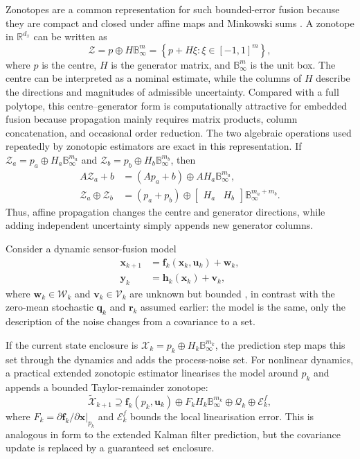 \documentclass[graybox,envcountchap]{style/SNmono}
\begin{document}
Zonotopes are a common representation for such bounded-error fusion because they are compact and closed under affine maps and Minkowski sums \cite{girard2005_zonotopes}. A zonotope in $\mathbb{R}^{d_x}$ can be written as
\begin{equation}
\mathcal{Z}=p\oplus H\mathbb{B}_{\infty}^{m}
=\left\{p+H\xi:\xi\in[-1,1]^m\right\},
\end{equation}
where $p$ is the centre, $H$ is the generator matrix, and $\mathbb{B}_{\infty}^{m}$ is the unit box. The centre can be interpreted as a nominal estimate, while the columns of $H$ describe the directions and magnitudes of admissible uncertainty. Compared with a full polytope, this centre--generator form is computationally attractive for embedded fusion because propagation mainly requires matrix products, column concatenation, and occasional order reduction.
The two algebraic operations used repeatedly by zonotopic estimators are exact in this representation. If $\mathcal{Z}_a=p_a\oplus H_a\mathbb{B}_{\infty}^{m_a}$ and $\mathcal{Z}_b=p_b\oplus H_b\mathbb{B}_{\infty}^{m_b}$, then
\begin{align}
A\mathcal{Z}_a+b
&=(Ap_a+b)\oplus AH_a\mathbb{B}_{\infty}^{m_a},\\
\mathcal{Z}_a\oplus\mathcal{Z}_b
&=(p_a+p_b)\oplus
\begin{bmatrix}H_a&H_b\end{bmatrix}
\mathbb{B}_{\infty}^{m_a+m_b}.
\end{align}
Thus, affine propagation changes the centre and generator directions, while adding independent uncertainty simply appends new generator columns.

Consider a dynamic sensor-fusion model
\begin{align}
\mathbf{x}_{k+1}&=\mathbf{f}_k(\mathbf{x}_k,\mathbf{u}_k)+\mathbf{w}_k,\\
\mathbf{y}_k&=\mathbf{h}_k(\mathbf{x}_k)+\mathbf{v}_k,
\end{align}
where $\mathbf{w}_k\in\mathcal{W}_k$ and $\mathbf{v}_k\in\mathcal{V}_k$ are unknown but bounded
, in contrast with the zero-mean stochastic $\mathbf{q}_k$ and $\mathbf{r}_k$ assumed earlier: the model is the same, only the description of the noise changes from a covariance to a set. 

If the current state enclosure is $\mathcal{X}_k=p_k\oplus H_k\mathbb{B}_{\infty}^{m_k}$, the prediction step maps this set through the dynamics and adds the process-noise set. For nonlinear dynamics, a practical extended zonotopic estimator linearises the model around $p_k$ and appends a bounded Taylor-remainder zonotope:
\begin{equation}
\widetilde{\mathcal{X}}_{k+1}
\supseteq
\mathbf{f}_k(p_k,\mathbf{u}_k)
\oplus F_k H_k\mathbb{B}_{\infty}^{m_k}
\oplus \mathcal{Q}_k
\oplus \mathcal{E}^{f}_k,
\end{equation}
where $F_k=\partial \mathbf{f}_k/\partial \mathbf{x}|_{p_k}$ and $\mathcal{E}^{f}_k$ bounds the local linearisation error. This is analogous in form to the extended Kalman filter prediction, but the covariance update is replaced by a guaranteed set enclosure.
\end{document}
